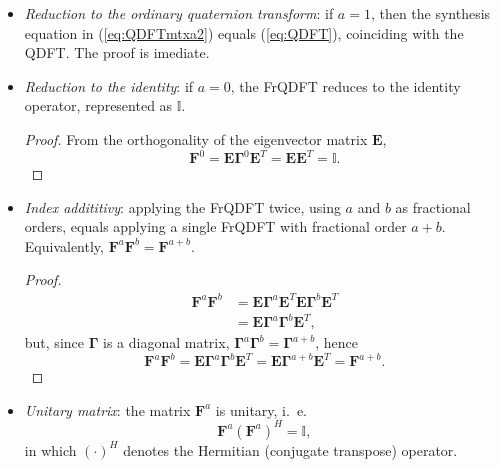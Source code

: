 \begin{itemize}
\item \textit{Reduction to the ordinary quaternion transform}: if $ a=1 $, then the synthesis equation in (\ref{eq:QDFTmtxa2}) equals (\ref{eq:QDFT}), coinciding with the QDFT. The proof is imediate.

\item \textit{Reduction to the identity}: if $ a=0 $, the FrQDFT reduces to the identity operator, represented as $ \mathbb{I} $.

\begin{proof}
From the orthogonality of the eigenvector matrix $ \mathbf{E} $,
\begin{equation}
\mathbf{F}^0 = \mathbf{E} \mathbf{\Gamma}^0 \mathbf{E}^T = \mathbf{E} \mathbf{E}^T = \mathbb{I}.
\end{equation}
\end{proof}

\item \textit{Index addititivy}: applying the FrQDFT twice, using $ a $ and $ b $ as fractional orders, equals applying a single FrQDFT with fractional order $ a+b $. Equivalently, $ \mathbf{F}^a \mathbf{F}^b = \mathbf{F}^{a+b} $.

\begin{proof}
\begin{equation}
\begin{aligned}
\mathbf{F}^a \mathbf{F}^b &= \mathbf{E} \mathbf{\Gamma}^a \mathbf{E}^T
\mathbf{E} \mathbf{\Gamma}^b \mathbf{E}^T \\
&= \mathbf{E} \mathbf{\Gamma}^a \mathbf{\Gamma}^b \mathbf{E}^T,
\end{aligned}
\end{equation}
but, since $ \mathbf{\Gamma} $ is a diagonal matrix, $ \mathbf{\Gamma}^a \mathbf{\Gamma}^b =
\mathbf{\Gamma}^{a+b} $, hence
\begin{equation}
\mathbf{F}^a \mathbf{F}^b = \mathbf{E} \mathbf{\Gamma}^a \mathbf{\Gamma}^b \mathbf{E}^T = \mathbf{E} \mathbf{\Gamma}^{a+b} \mathbf{E}^T =
\mathbf{F}^{a+b}.
\end{equation}
\end{proof}

\item \textit{Unitary matrix}: the matrix $ \mathbf{F}^a $ is unitary, i.~e.
\begin{equation}
\mathbf{F}^a (\mathbf{F}^a)^H = \mathbb{I},
\end{equation}
in which $ (\cdot)^H $ denotes the Hermitian (conjugate transpose) operator.


\end{itemize}
